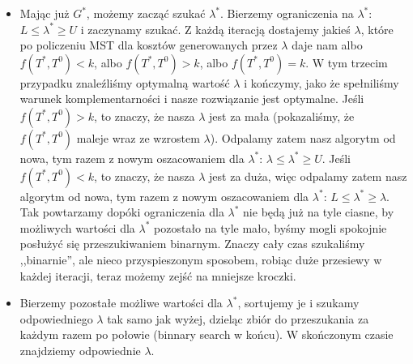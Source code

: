 \begin{itemize}
	\item Mając już $G^{\ast}$, możemy zacząć szukać $\lambda^{\ast}$. Bierzemy ograniczenia na $\lambda^{\ast}$: $L \leqslant \lambda^{\ast} \geqslant U$ i zaczynamy szukać. Z każdą iteracją dostajemy jakieś $\lambda$, które po policzeniu MST dla kosztów generowanych przez $\lambda$ daje nam albo $f \left( T^{\ast}, T^{0} \right) < k$, albo $f \left( T^{\ast}, T^{0} \right) > k$, albo $f \left( T^{\ast}, T^{0} \right) = k$. W tym trzecim przypadku znaleźliśmy optymalną wartość $\lambda$ i kończymy, jako że spełniliśmy warunek komplementarności i nasze rozwiązanie jest optymalne. Jeśli $f \left( T^{\ast}, T^{0} \right) > k$, to znaczy, że nasza $\lambda$ jest za mała (pokazaliśmy, że $f \left( T^{\ast}, T^{0} \right)$ maleje wraz ze wzrostem $\lambda$). Odpalamy zatem nasz algorytm od nowa, tym razem z nowym oszacowaniem dla $\lambda^{\ast}$: $\lambda \leqslant \lambda^{\ast} \geqslant U$. Jeśli $f \left( T^{\ast}, T^{0} \right) < k$, to znaczy, że nasza $\lambda$ jest za duża, więc odpalamy zatem nasz algorytm od nowa, tym razem z nowym oszacowaniem dla $\lambda^{\ast}$: $L \leqslant \lambda^{\ast} \geqslant \lambda$. Tak powtarzamy dopóki ograniczenia dla $\lambda^{\ast}$ nie będą już na tyle ciasne, by możliwych wartości dla $\lambda^{\ast}$ pozostało na tyle mało, byśmy mogli spokojnie posłużyć się przeszukiwaniem binarnym. Znaczy cały czas szukaliśmy ,,binarnie'', ale nieco przyspieszonym sposobem, robiąc duże przesiewy w każdej iteracji, teraz możemy zejść na mniejsze kroczki.
	
	\item Bierzemy pozostałe możliwe wartości dla $\lambda^{\ast}$, sortujemy je i szukamy odpowiedniego $\lambda$ tak samo jak wyżej, dzieląc zbiór do przeszukania za każdym razem po połowie (binnary search w końcu). W skończonym czasie znajdziemy odpowiednie $\lambda$.
	

\end{itemize}
